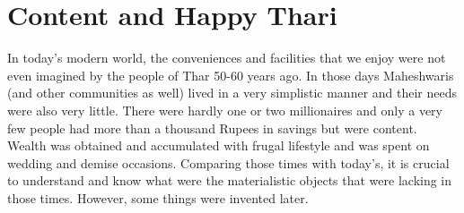 \chapter{Content and Happy Thari}
In today's modern world, the conveniences and facilities that we enjoy were not even imagined by the people of Thar 50-60 years ago. In those days Maheshwaris (and other communities as well) lived in a very simplistic manner and their needs were also very little. There were hardly one or two millionaires and only a very few people had more than a thousand Rupees in savings but were content. Wealth was obtained and accumulated with frugal lifestyle and was spent on wedding and demise occasions. Comparing those times with today's, it is crucial to understand and know what were the materialistic objects that were lacking in those times. However, some things were invented later.

